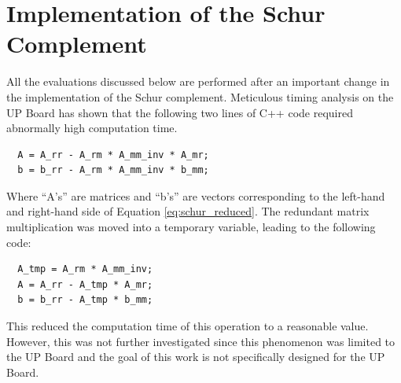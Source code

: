 \section{Implementation of the Schur Complement}
All the evaluations discussed below are performed after an important change in 
the implementation of the Schur complement. Meticulous timing analysis on the 
UP Board has shown that the following two lines of C++ code required 
abnormally high computation time. 
\begin{lstlisting}
  A = A_rr - A_rm * A_mm_inv * A_mr;
  b = b_rr - A_rm * A_mm_inv * b_mm;
\end{lstlisting}
Where ``A's'' are matrices and ``b's'' are vectors corresponding to the 
left-hand and right-hand side of Equation \eqref{eq:schur_reduced}. The 
redundant matrix multiplication was moved into a temporary variable, leading to 
the following code: 
\begin{lstlisting}
  A_tmp = A_rm * A_mm_inv;
  A = A_rr - A_tmp * A_mr;
  b = b_rr - A_tmp * b_mm;
\end{lstlisting}
This reduced the computation time of this operation to a reasonable value. 
However, this was not further 
investigated since this phenomenon was limited to the UP Board and the goal 
of this work is not specifically designed for the UP Board. 

